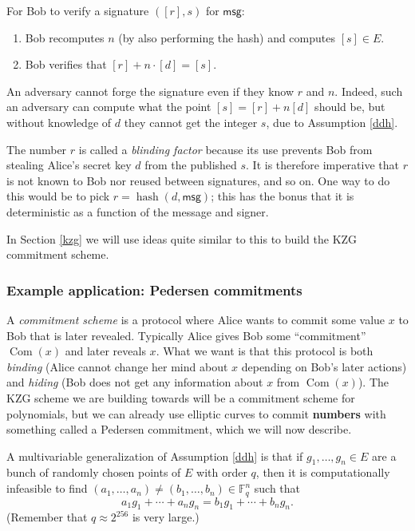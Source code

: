 \begin{algo}
\leavevmode
For Bob to verify a signature
\(( [ r],s )\) for \(\textsf{msg}\):

\begin{enumerate}
\item
  Bob recomputes \(n\) (by also performing the hash) and computes
  \([ s] \in E\).
\item
  Bob verifies that
  \([ r] + n \cdot [ d] = [ s]\).
\end{enumerate}
\end{algo}

An adversary cannot forge the signature even if they know \(r\) and
\(n\). Indeed, such an adversary can compute what the point
\([ s] = [ r] + n[ d]\) should be,
but without knowledge of \(d\) they cannot get the integer \(s\), due to
Assumption \ref{ddh}.

The number \(r\) is called a \emph{blinding factor} because its use
prevents Bob from stealing Alice's secret key \(d\) from the published
\(s\). It is therefore imperative that \(r\) is not known to Bob nor
reused between signatures, and so on. One way to do this would be to
pick \(r = \operatorname{hash}(d,\textsf{msg})\); this has the
bonus that it is deterministic as a function of the message and signer.

In Section \ref{kzg} we will use ideas quite similar to this to build the KZG
commitment scheme.

\subsubsection{Example application: Pedersen commitments}
\label{pedersen}

A \emph{commitment scheme} is a protocol where Alice wants to commit
some value \(x\) to Bob that is later revealed. Typically Alice gives
Bob some ``commitment'' \(\operatorname{Com}(x)\) and later reveals
\(x\). What we want is that this protocol is both \emph{binding} (Alice
cannot change her mind about \(x\) depending on Bob's later actions) and
\emph{hiding} (Bob does not get any information about \(x\) from
\(\operatorname{Com}(x)\)). The KZG scheme we are building towards will
be a commitment scheme for polynomials, but we can already use elliptic
curves to commit \textbf{numbers} with something called a Pedersen
commitment, which we will now describe.

A multivariable generalization of Assumption \ref{ddh} is that if
\(g_{1},\ldots,g_{n} \in E\) are a bunch of randomly chosen points of
\(E\) with order \(q\), then it is computationally infeasible to find
\(( a_{1},\ldots,a_{n} ) \neq ( b_{1},\ldots,b_{n} ) \in {\mathbb{F}}_{q}^{n}\)
such that
\[a_{1}g_{1} + \cdots + a_{n}g_{n} = b_{1}g_{1} + \cdots + b_{n}g_{n}.\]
(Remember that \(q \approx 2^{256}\) is very large.)

